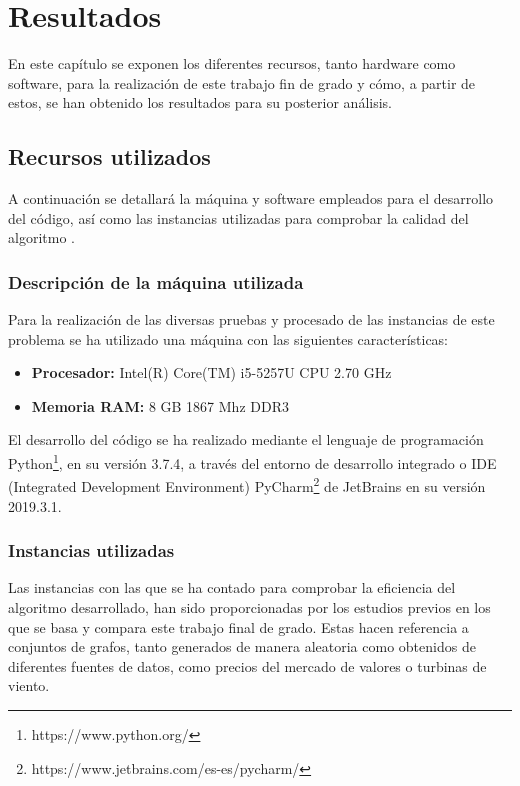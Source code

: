 
\chapter{Resultados} %

\label{Chapter5} %


En este capítulo se exponen los diferentes recursos, tanto hardware como software, para la realización de este trabajo fin de grado y cómo, a partir de estos, se han obtenido los resultados para su posterior análisis.

\section{Recursos utilizados}
A continuación se detallará la máquina y software empleados para el desarrollo del código, así como las instancias utilizadas para comprobar la calidad del algoritmo .

\subsection{Descripción de la máquina utilizada}
\label{sec:maquina}
Para la realización de las diversas pruebas y procesado de las instancias de este problema se ha utilizado una máquina con las siguientes características:

\begin{itemize}

\item \textbf{Procesador:} Intel(R) Core(TM) i5-5257U CPU 2.70 GHz
\item \textbf{Memoria RAM:} 8 GB 1867 Mhz DDR3
\end{itemize}

El desarrollo del código se ha realizado mediante el lenguaje de programación Python\footnote{https://www.python.org/}, en su versión 3.7.4, a través del entorno de desarrollo integrado o \gls{IDE} (Integrated Development Environment) PyCharm\footnote{https://www.jetbrains.com/es-es/pycharm/} de JetBrains en su versión 2019.3.1.

\subsection{Instancias utilizadas}
\label{sec:Instancias-utilizadas}
Las instancias con las que se ha contado para comprobar la eficiencia del algoritmo desarrollado, han sido proporcionadas por los estudios previos en los que se basa y compara este trabajo final de grado. Estas hacen referencia a conjuntos de grafos, tanto generados de manera aleatoria como obtenidos de diferentes fuentes de datos, como precios del mercado de valores o turbinas de viento.

